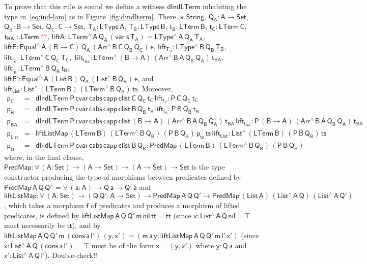 \documentclass[9pt]{entcs}
\begin{document}
\noindent
To prove that this rule is sound we define a witness
$\mathsf{dIndLTerm}$ inhabiting the type in~\eqref{eq:ind-lam} as in
Figure~\ref{fig:dindlterm}. There, $\mathsf{s : String}$, $\mathsf{Q_A
  : A \to Set}$, $\mathsf{Q_B : B \to Set}$, $\mathsf{Q_C : C \to
  Set}$, $\mathsf{T_A : LType\,A}$, $\mathsf{T_B : LType\,B}$,
$\mathsf{t_B : LTerm\,B}$, $\mathsf{t_C : LTerm\,C}$, $\mathsf{t_{BA}
  : LTerm\,{\color{red}??}}$, $\mathsf{liftA : LTerm^{\wedge}\, A\,
  Q_A\, (var\;s\,T_A) = LType^{\wedge}\,A\,Q_A\,T_A}$, $\mathsf{liftE
  : Equal^{\wedge} \, A\, (B \to C)\, Q_A\, (Arr^{\wedge} \, B\, C\,
  Q_B \, Q_C) \, e}$, $\mathsf{lift_{T_B}: LType^{\wedge} \, B\, Q_B\,
  T_B}$,~$\mathsf{lift_{t_C}: LTerm^{\wedge} \, C\, Q_C\,
  T_C}$,~$\mathsf{lift_{t_{BA}}: LTerm^{\wedge} \, (B \to A)\,
  (Arr^{\wedge} \, B\, A\, Q_B \, Q_A)\,
  t_{BA}}$,~$\mathsf{lift_{t_B}: LTerm^{\wedge} \, B\, Q_B\,
  t_B}$,\\ $\mathsf{liftE' : Equal^{\wedge}\, A\, (List\,B)\, Q_A\,
  (List^{\wedge}\, B\, Q_B)\, e}$, and $\mathsf{lift_{List}:
  List^{\wedge} \, (LTerm\, B) \, (LTerm^{\wedge}\, B\, Q_B) \, ts}$.
Moreover,
\[\begin{array}{lll}
\mathsf{p_C} & = & \mathsf{dIndLTerm\,P\,cvar\,cabs \,capp \,clist\,
  C\, Q_C\, t_C\, lift_{t_C} : P \, C\, Q_C \, t_C }\\
\mathsf{p_B} & = & \mathsf{dIndLTerm\,P\,cvar\,cabs \,capp \,clist\,
  B\, Q_B\, t_B\, lift_{t_B} : P \, B\, Q_B \, t_B }\\
\mathsf{p_{BA}} & = & \mathsf{dIndLTerm\,P\,cvar\,cabs \,capp
  \,clist\, (B \to A)\,(Arr^{\wedge} \, B\, A\, Q_B \, Q_A) \,
  t_{BA}\, lift_{t_{BA}} : P \, (B \to A)\, (Arr^{\wedge} \, B\, A\,
  Q_B \, Q_A) \, t_{BA}}\\ 
\mathsf{p_{List}} & = &\mathsf{liftListMap \, (LTerm\, B) \,
  (LTerm^{\wedge} \, B \, Q_B)\, (P\,B\,Q_B)\, p_{ts} \, ts\,
  lift_{List} : List^{\wedge}\, (LTerm\,B) \, (P\,B\,Q_B) \, ts}\\
\mathsf{p_{ts}} & = & \mathsf{dIndLTerm\, P\, cvar\, cabs\, capp\,
  clist\, B\, Q_B : PredMap\,(LTerm\,B) \,(LTerm^{\wedge}\, B\, Q_B)
  \, (P\,B\,Q_B)}
\end{array}\]
where, in the final clause, $\mathsf{PredMap : \forall\, (A : Set) \to
  (A \to Set) \to (A \to Set) \to Set }$ is the type constructor
producing the type of morphisms between predicates defined by
$\mathsf{PredMap \,A\, Q\,Q'\, = \forall\, (a : A) \to Q\,a \to
  Q'\,a}$ and $\mathsf{liftListMap : \forall\, (A : Set) \to (Q \, Q'
  : A \to Set) \to PredMap\,A\,Q\,Q' \to PredMap\,(List\,A)
  \,(List^{\wedge}\, A\, Q)\, (List^{\wedge}\, A\, Q')}$, which takes
a morphism $\mathsf{f}$ of predicates and produces a morphism of
lifted predicates, is defined by $\mathsf{liftListMap\, A\, Q\, Q'\,
  m\, nil\, tt = tt}$ (since $\mathsf{x : List^{\wedge}\, A\, Q\, nil
  = \top}$ must necessarily be $\mathsf{tt}$), and by
$\mathsf{liftListMap\, A\, Q\, Q'\, m\, (cons\, a\, l')\, (y, x') =
  (m\,a\,y, liftListMap\, A\, Q\, Q'\, m\, l'\, x')}$ (since $\mathsf{x
  : List^{\wedge}\, A\, Q\, (cons\, a\, l') = \top}$ must be of the
form $\mathsf{x = (y, x')}$ where $\mathsf{y : Q\,a}$ and $\mathsf{x'
  : List^{\wedge}\, A\, Q\, l'}$). {\color{red} Double-check!!}
\end{document}
